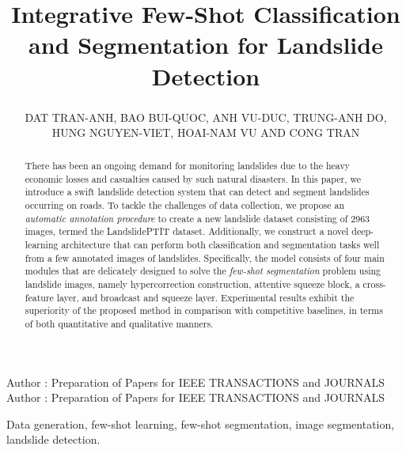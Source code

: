 \documentclass{ieeeaccess}
\begin{document}

\title{Integrative Few-Shot Classification and Segmentation for Landslide Detection}
\author{\uppercase{Dat Tran-Anh}\textsuperscript{\textsection},
\uppercase{Bao Bui-Quoc\textsuperscript{\textsection}, Anh Vu-Duc, Trung-Anh Do, Hung Nguyen-Viet, Hoai-Nam Vu and Cong Tran}}
\address[1]{Posts and Telecommunications Institute of Technology, Hanoi, Vietnam}
\address[2]{Hanoi University of Science and Technology, Hanoi, Vietnam}


\markboth
{Author \headeretal: Preparation of Papers for IEEE TRANSACTIONS and JOURNALS}
{Author \headeretal: Preparation of Papers for IEEE TRANSACTIONS and JOURNALS}




\begin{abstract}
There has been an ongoing demand for monitoring landslides due to the heavy economic losses and casualties caused by such natural disasters. In this paper, we introduce a swift landslide detection system that can detect and segment landslides occurring on roads. To tackle the challenges of data collection, we propose an {\em automatic annotation procedure} to create a new landslide dataset consisting of 2963 images, termed the LandslidePTIT dataset. Additionally, we construct a novel deep-learning architecture that can perform both classification and segmentation tasks well from a few annotated images of landslides. Specifically, the model consists of four main modules that are delicately designed to solve the {\em few-shot segmentation} problem using landslide images, namely hypercorrection construction, attentive squeeze block, a cross-feature layer, and broadcast and squeeze layer. Experimental results exhibit the superiority of the proposed method in comparison with competitive baselines, in terms of both quantitative and qualitative manners.
\end{abstract}

\begin{keywords}
Data generation, few-shot learning, few-shot segmentation, image segmentation, landslide detection. 
\end{keywords}
\end{document}
